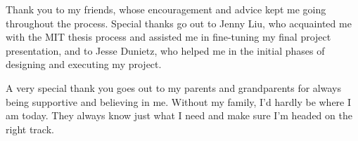 Thank you to my friends, whose encouragement and advice kept me going throughout the process. Special thanks go out to Jenny Liu, who acquainted me with the MIT thesis process and assisted me in fine-tuning my final project presentation, and to Jesse Dunietz, who helped me in the initial phases of designing and executing my project.


A very special thank you goes out to my parents and grandparents for always being supportive and believing in me. Without my family, I'd hardly be where I am today. They always know just what I need and make sure I'm headed on the right track.




